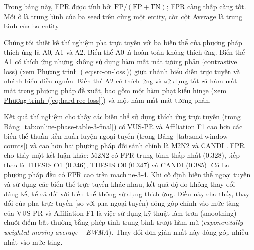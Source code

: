 Trong bảng này, FPR được tính bởi $\mathrm{FP}/(\mathrm{FP}+\mathrm{TN})$; FPR càng thấp càng tốt. Mỗi ô là trung bình của ba seed trên cùng một entity, còn cột Average là trung bình của ba entity.

Chúng tôi thiết kế thí nghiệm pha trực tuyến với ba biến thể của phương pháp thích ứng là A0, A1 và A2. Biến thể A0 là hoàn toàn không thích ứng. Biến thể A1 có thích ứng nhưng không sử dụng hàm mất mát tương phản (contrastive loss) (xem \hyperref[eq:src-on-loss]{Phương trình~(\ref*{eq:src-on-loss})}) giữa nhánh biểu diễn trực tuyến và nhánh biểu diễn nguồn. Biến thể A2 có thích ứng và sử dụng tất cả hàm mất mát trong phương pháp đề xuất, bao gồm một hàm phạt kiểu hinge (xem \hyperref[eq:hard-rec-loss]{Phương trình~(\ref*{eq:hard-rec-loss})}) và một hàm mất mát tương phản.

\pagebreak
Kết quả thí nghiệm cho thấy các biến thể sử dụng thích ứng trực tuyến (trong \hyperref[tab:online-phase-table-3-final]
{Bảng~\ref*{tab:online-phase-table-3-final}}) có VUS-PR và Affiliation F1 cao hơn các biến thể thuần tiền huấn luyện ngoại tuyến (trong \hyperref[tab:smd-window-counts] {Bảng~\ref*{tab:smd-window-counts}}) và cao hơn hai phương pháp đối sánh chính là M2N2 \cite{Kim_Park_Choo_2024} và CANDI \cite{Kim_Mok_Lee_Shin_Yoon_2026}. FPR cho thấy một kết luận khác: M2N2 có FPR trung bình thấp nhất (0.328), tiếp theo là THESIS O1 (0.346), THESIS O0 (0.347) và CANDI (0.385). Cả ba phương pháp đều có FPR cao trên machine-3-4. Khi cố định biến thể ngoại tuyến và sử dụng các biến thể trực tuyến khác nhau, kết quả độ đo không thay đổi đáng kể, kể cả đối với biến thể không sử dụng thích ứng. Điều này cho thấy, thay đổi của pha trực tuyến (so với pha ngoại tuyến) đóng góp chính vào mức tăng của VUS-PR và Affiliation F1 là việc sử dụng kỹ thuật làm trơn (smoothing) chuỗi điểm bất thường bằng phép tính trung bình trượt hàm mũ (\textit{exponentially weighted moving average -- EWMA}). Thay đổi đơn giản nhất này đóng góp nhiều nhất vào mức tăng.
